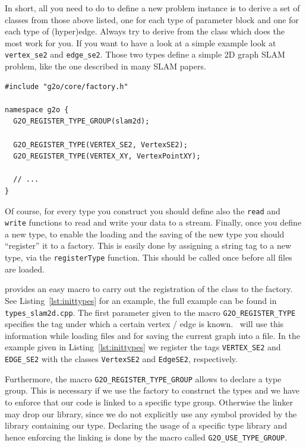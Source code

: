 \documentclass[a4paper]{article}
\begin{document}
In short, all you need to do to define a new problem instance is to
derive a set of classes from those above listed, one for each type of
parameter block and one for each type of (hyper)edge. Always try to
derive from the class which does the most work for you.  If you want to
have a look at a simple example look at \verb+vertex_se2+ and
\verb+edge_se2+. Those two types define a simple 2D graph SLAM
problem, like the one described in many SLAM papers.

\begin{lstlisting}[float,label=lst:inittypes,caption=Registering types
  by a constructor from a library]
#include "g2o/core/factory.h"

namespace g2o {
  G2O_REGISTER_TYPE_GROUP(slam2d);

  G2O_REGISTER_TYPE(VERTEX_SE2, VertexSE2);
  G2O_REGISTER_TYPE(VERTEX_XY, VertexPointXY);

  // ...
}
\end{lstlisting}

Of course, for every type you construct you should define also the
\verb+read+ and \verb+write+ functions to read and write your data to a
stream.  Finally, once you define a new type, to enable the loading and
the saving of the new type you should ``register'' it to a factory.
This is easily done by assigning a string tag to a new type, via the
\verb+registerType+ function. This should be called once before
all files are loaded.

\gopt{} provides an easy macro to carry out the registration of the
class to the factory.  See Listing~\ref{lst:inittypes} for an example,
the full example can be found in \verb+types_slam2d.cpp+.  The first
parameter given to the macro \verb+G2O_REGISTER_TYPE+ specifies the tag
under which a certain vertex / edge is known. \gopt\ will use this
information while loading files and for saving the current graph into a
file. In the example given in Listing~\ref{lst:inittypes} we register
the tags \verb+VERTEX_SE2+ and \verb+EDGE_SE2+ with the classes
\verb+VertexSE2+ and \verb+EdgeSE2+, respectively.

Furthermore, the macro \verb+G2O_REGISTER_TYPE_GROUP+ allows to declare
a type group. This is necessary if we use the factory to construct the
types and we have to enforce that our code is linked to a specific type
group. Otherwise the linker may drop our library, since we do not
explicitly use any symbol provided by the library containing our type.
Declaring the usage of a specific type library and hence enforcing the
linking is done by the macro called \verb+G2O_USE_TYPE_GROUP+.
\end{document}
